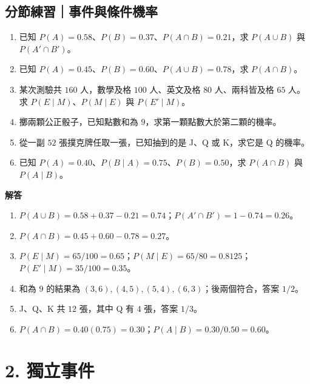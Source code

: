 \documentclass[11pt,a4paper]{article}
\providecommand{\tightlist}{%
  \setlength{\itemsep}{0pt}\setlength{\parskip}{0pt}}
\begin{document}
\begin{HandoutSelfCheck}

\subsection{分節練習｜事件與條件機率}\label{ux5206ux7bc0ux7df4ux7fd2ux4e8bux4ef6ux8207ux689dux4ef6ux6a5fux7387}

\begin{enumerate}
\def\labelenumi{\arabic{enumi}.}
\tightlist
\item
  已知 \(P(A)=0.58\)、\(P(B)=0.37\)、\(P(A\cap B)=0.21\)，求 \(P(A\cup B)\) 與 \(P(A'\cap B')\)。
\item
  已知 \(P(A)=0.45\)、\(P(B)=0.60\)、\(P(A\cup B)=0.78\)，求 \(P(A\cap B)\)。
\item
  某次測驗共 \(160\) 人，數學及格 \(100\) 人、英文及格 \(80\) 人、兩科皆及格 \(65\) 人。求 \(P(E\mid M)\)、\(P(M\mid E)\) 與 \(P(E'\mid M)\)。
\item
  擲兩顆公正骰子，已知點數和為 \(9\)，求第一顆點數大於第二顆的機率。
\item
  從一副 \(52\) 張撲克牌任取一張，已知抽到的是 J、Q 或 K，求它是 Q 的機率。
\item
  已知 \(P(A)=0.40\)、\(P(B\mid A)=0.75\)、\(P(B)=0.50\)，求 \(P(A\cap B)\) 與 \(P(A\mid B)\)。
\end{enumerate}

\textbf{解答}

\begin{enumerate}
\def\labelenumi{\arabic{enumi}.}
\tightlist
\item
  \(P(A\cup B)=0.58+0.37-0.21=\boxed{0.74}\)；\(P(A'\cap B')=1-0.74=\boxed{0.26}\)。
\item
  \(P(A\cap B)=0.45+0.60-0.78=\boxed{0.27}\)。
\item
  \(P(E\mid M)=65/100=\boxed{0.65}\)；\(P(M\mid E)=65/80=\boxed{0.8125}\)；\(P(E'\mid M)=35/100=\boxed{0.35}\)。
\item
  和為 \(9\) 的結果為 \((3,6),(4,5),(5,4),(6,3)\)；後兩個符合，答案 \(\boxed{1/2}\)。
\item
  J、Q、K 共 \(12\) 張，其中 Q 有 \(4\) 張，答案 \(\boxed{1/3}\)。
\item
  \(P(A\cap B)=0.40(0.75)=\boxed{0.30}\)；\(P(A\mid B)=0.30/0.50=\boxed{0.60}\)。
\end{enumerate}

\end{HandoutSelfCheck}

\section{2. 獨立事件}\label{ux7368ux7acbux4e8bux4ef6}
\end{document}
